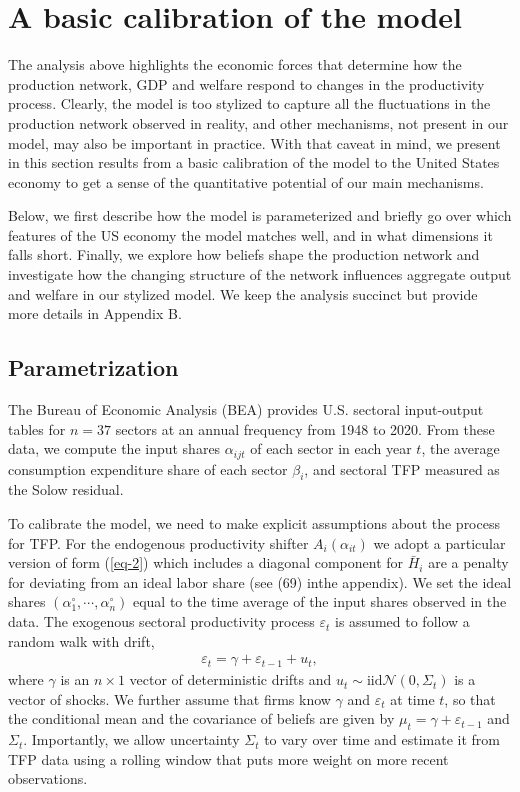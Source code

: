 \documentclass[11pt]{article}
\theoremstyle{definition}
\begin{document}
	\clearpage
	\section{A basic calibration of the model}
	The analysis above highlights the economic forces that determine how the production network, GDP and welfare respond to changes in the productivity process. Clearly, the model is too stylized to capture all the fluctuations in the production network observed in reality, and other mechanisms, not present in our model, may also be important in practice. With that caveat in mind, we present in this section results from a basic calibration of the model to the United States economy to get a sense of the quantitative potential of our main mechanisms.
	
	Below, we first describe how the model is parameterized and briefly go over which features of the US economy the model matches well, and in what dimensions it falls short. Finally, we explore how beliefs shape the production network and investigate how the changing structure of the network influences aggregate output and welfare in our stylized model. We keep the analysis succinct but provide more details in Appendix B.
	
	\subsection{Parametrization}
	The Bureau of Economic Analysis (BEA) provides U.S. sectoral input-output tables for $n = 37$ sectors at an annual frequency from 1948 to 2020. From these data, we compute the input shares $\alpha_{ijt}$ of each sector in each year $t$, the average consumption expenditure share of each sector $\beta_i$, and sectoral TFP measured as the Solow residual.
	
	To calibrate the model, we need to make explicit assumptions about the process for TFP. For the endogenous productivity shifter $A_i(\alpha_{it})$ we adopt a particular version of form (\ref{eq-2}) which includes a diagonal component for $\bar{H}_i$ are a penalty for deviating from an ideal labor share (see (69) inthe appendix). We set the ideal shares $(\alpha_1^{\circ},\cdots,\alpha_n^{\circ})$ equal to the time average of the input shares observed in the data. The exogenous sectoral productivity process $\varepsilon_t$ is assumed to follow a random walk with drift,
	\begin{align}
		\varepsilon_t = \gamma + \varepsilon_{t-1} + u_t, \label{eq-42}
	\end{align}
	where $\gamma$ is an $n \times 1$ vector of deterministic drifts and $u_t \sim \text{iid} \mathcal{N}(0, \Sigma_t)$ is a vector of shocks. We further assume that firms know $\gamma$ and $\varepsilon_t$ at time $t$, so that the conditional mean and the covariance of beliefs are given by $\mu_t = \gamma + \varepsilon_{t-1}$ and $\Sigma_t$. Importantly, we allow uncertainty $\Sigma_t$ to vary over time and estimate it from TFP data using a rolling window that puts more weight on more recent observations.
	
\end{document}
